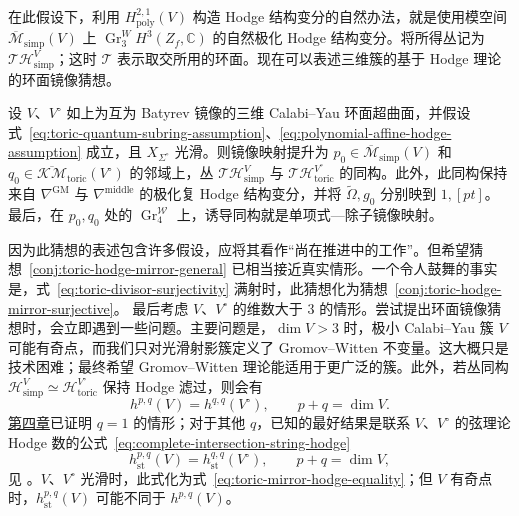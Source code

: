 在此假设下，利用 $H^{2,1}_{\mathrm{poly}}(V)$ 构造 Hodge 结构变分的自然办法，就是使用模空间 $\overline{\mathcal M}_{\mathrm{simp}}(V)$ 上 $\operatorname{Gr}^W_3H^3(Z_f,\mathbb C)$ 的自然极化 Hodge 结构变分。将所得丛记为 $\mathcal T\mathcal H^V_{\mathrm{simp}}$；这时 $\mathcal T$ 表示取交所用的环面。现在可以表述三维簇的基于 Hodge 理论的环面镜像猜想。
\begin{conjecture}\label{conj:toric-hodge-mirror-general}
设 $V$、$V^\circ$ 如上为互为 Batyrev 镜像的三维 Calabi--Yau 环面超曲面，并假设式~\eqref{eq:toric-quantum-subring-assumption}、\eqref{eq:polynomial-affine-hodge-assumption} 成立，且 $X_{\Sigma^\circ}$ 光滑。则镜像映射提升为 $p_0\in\overline{\mathcal M}_{\mathrm{simp}}(V)$ 和 $q_0\in\overline{\mathcal{KM}}_{\mathrm{toric}}(V^\circ)$ 的邻域上，丛 $\mathcal T\mathcal H^V_{\mathrm{simp}}$ 与 $\mathcal T\mathcal H^{V^\circ}_{\mathrm{toric}}$ 的同构。此外，此同构保持来自 $\nabla^{\mathrm{GM}}$ 与 $\nabla^{\mathrm{middle}}$ 的极化复 Hodge 结构变分，并将 $\widetilde\Omega,g_0$ 分别映到 $1,[pt]$。最后，在 $p_0,q_0$ 处的 $\operatorname{Gr}^{\mathcal W}_4$ 上，诱导同构就是单项式—除子镜像映射。
\end{conjecture}
因为此猜想的表述包含许多假设，应将其看作“尚在推进中的工作”。但希望猜想~\ref{conj:toric-hodge-mirror-general} 已相当接近真实情形。一个令人鼓舞的事实是，式~\eqref{eq:toric-divisor-surjectivity} 满射时，此猜想化为猜想~\ref{conj:toric-hodge-mirror-surjective}。
最后考虑 $V$、$V^\circ$ 的维数大于 $3$ 的情形。尝试提出环面镜像猜想时，会立即遇到一些问题。主要问题是，$\dim V>3$ 时，极小 Calabi--Yau 簇 $V$ 可能有奇点，而我们只对光滑射影簇定义了 Gromov--Witten 不变量。这大概只是技术困难；最终希望 Gromov--Witten 理论能适用于更广泛的簇。此外，若丛同构 $\mathcal H^V_{\mathrm{simp}}\simeq\mathcal H^{V^\circ}_{\mathrm{toric}}$ 保持 Hodge 滤过，则会有
\begin{equation}\label{eq:toric-mirror-hodge-equality}
h^{p,q}(V)=h^{q,q}(V^\circ),\qquad p+q=\dim V.
\end{equation}
\hyperref[chap:mirror-constructions]{第四章}已证明 $q=1$ 的情形；对于其他 $q$，已知的最好结果是联系 $V$、$V^\circ$ 的弦理论 Hodge 数的公式~\eqref{eq:complete-intersection-string-hodge}
\[
h^{p,q}_{\mathrm{st}}(V)=h^{q,q}_{\mathrm{st}}(V^\circ),\qquad p+q=\dim V,
\]
见 。$V$、$V^\circ$ 光滑时，此式化为式~\eqref{eq:toric-mirror-hodge-equality}；但 $V$ 有奇点时，$h^{p,q}_{\mathrm{st}}(V)$ 可能不同于 $h^{p,q}(V)$。

